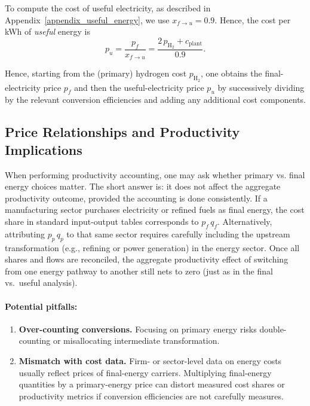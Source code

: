 To compute the cost of useful electricity, as described in Appendix~\ref{appendix_useful_energy}, we use $x_{f \to u} = 0.9$. Hence, the cost per kWh of \emph{useful} energy is
\begin{equation*}
     p_u = \frac{p_f}{x_{f \to u}}
             = \frac{2\,p_{\mathrm{H_2}} + c_{\mathrm{plant}}}{0.9}.
\end{equation*}

Hence, starting from the (primary) hydrogen cost $p_{\mathrm{H_2}}$, one obtains the final-electricity price $p_f$ and then the useful-electricity price $p_u$ by successively dividing by the relevant conversion efficiencies and adding any additional cost components.


\subsection{Price Relationships and Productivity Implications}

When performing productivity accounting, one may ask whether primary vs. final energy choices matter. The short answer is: it does not affect the aggregate productivity outcome, provided the accounting is done consistently.  If a manufacturing sector purchases electricity or refined fuels as final energy, the cost share in standard input-output tables corresponds to $p_f\,q_f$.  Alternatively, attributing $p_p\,q_p$ to that same sector requires carefully including the upstream transformation (e.g., refining or power generation) in the energy sector.  Once all shares and flows are reconciled, the aggregate productivity effect of switching from one energy pathway to another still nets to zero (just as in the final vs.\ useful analysis).

\paragraph{Potential pitfalls:} 
\begin{enumerate} 
\item \textbf{Over-counting conversions.} Focusing on primary energy risks double-counting or misallocating intermediate transformation. 
\item \textbf{Mismatch with cost data.} Firm- or sector-level data on energy costs usually reflect prices of final-energy carriers. Multiplying final-energy quantities by a primary-energy price can distort measured cost shares or productivity metrics if conversion efficiencies are not carefully measures. 
\end{enumerate}


